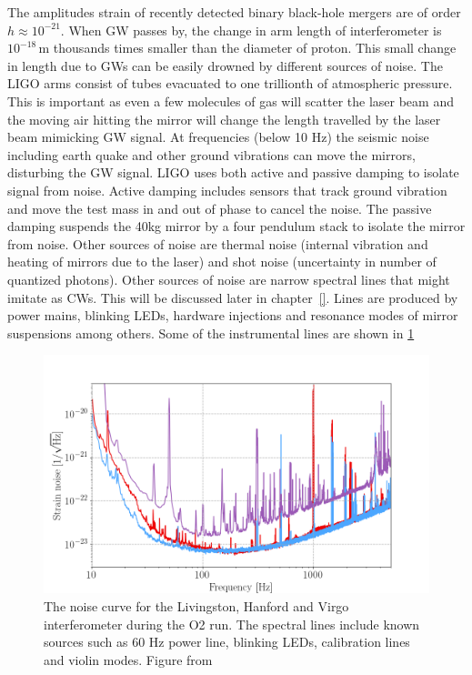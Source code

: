 \documentclass{ttuthes2007}
\begin{document}
The amplitudes strain of recently detected binary black-hole mergers are
of order $h \approx10^{-21}$. When \ac{GW} passes by, the change in arm length of
interferometer is $10^{-18}$\,m thousands times smaller than the diameter of proton. This small
change in length due to \acp{GW} can be easily drowned by different sources of
noise. The LIGO arms consist of tubes evacuated to one trillionth of
atmospheric pressure. This is important as even a few molecules of gas will
scatter the laser beam and the moving air hitting the mirror will change the
length travelled by the laser beam mimicking \ac{GW} signal.
 At frequencies (below 10 Hz) the seismic noise including earth
quake and other ground vibrations can move the mirrors, disturbing the \ac{GW}
signal. LIGO uses both active and passive damping to isolate signal from noise.
Active damping includes sensors that track ground vibration and move the
test mass in and out of phase to cancel the noise. The passive damping suspends the
40kg mirror by a four pendulum stack to isolate the mirror from noise. Other sources of
noise are thermal noise (internal vibration and heating of mirrors due to the laser)
and shot noise (uncertainty in number of quantized photons). 
Other sources of noise are narrow spectral lines that might imitate as \acp{CW}.
This will be discussed later in chapter~\ref{}. Lines are produced by power
mains, blinking LEDs, hardware injections and resonance modes of mirror
suspensions among others. Some of the instrumental lines are shown in \ref{fig:CWnoise}
\begin{figure}[bht!]
	\includegraphics[width=\textwidth]{figure/CWnoise.png}
	\caption{The noise curve for the Livingston, Hanford and Virgo
interferometer during the \ac{O2} run. The spectral lines include known sources such as
60 Hz power line, blinking LEDs, calibration lines and violin modes. Figure from
~\cite{Abbott_2019} }
	\label{fig:CWnoise}
\end{figure}
\end{document}
